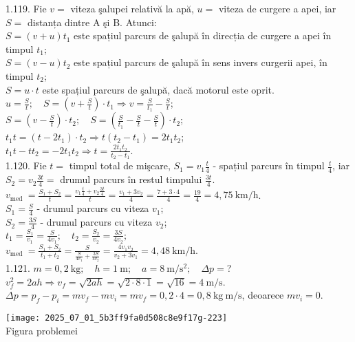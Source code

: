 1.119. Fie $v=$ viteza şalupei relativă la apă, $u=$ viteza de curgere a apei, iar $S=$ distanța dintre A şi B. Atunci:\\ $S=(v+u) t_{1}$ este spațiul parcurs de şalupă în direcția de curgere a apei în timpul $t_{1}$;\\ $S=(v-u) t_{2}$ este spațiul parcurs de şalupă în sens invers curgerii apei, în timpul $t_{2}$;\\ $S=u \cdot t$ este spațiul parcurs de şalupă, dacă motorul este oprit.\\ $u=\frac{S}{t}; \quad S=\left(v+\frac{S}{t}\right) \cdot t_{1} \Rightarrow v=\frac{S}{t_{1}}-\frac{S}{t}$;\\ $S=\left(v-\frac{S}{t}\right) \cdot t_{2}; \quad S=\left(\frac{S}{t_{1}}-\frac{S}{t}-\frac{S}{t}\right) \cdot t_{2}$;\\ $t_{1} t=\left(t-2 t_{1}\right) \cdot t_{2} \Rightarrow t\left(t_{2}-t_{1}\right)=2 t_{1} t_{2}$;\\ $t_{1} t-t t_{2}=-2 t_{1} t_{2} \Rightarrow t=\frac{2 t_{1} t_{2}}{t_{2}-t_{1}}$.\\

1.120. Fie $t=$ timpul total de mişcare, $S_{1}=v_{1} \frac{t}{4}$ - spațiul parcurs în timpul $\frac{t}{4}$, iar $S_{2}=v_{2} \frac{3 t}{4}=$ drumul parcurs în restul timpului $\frac{3 t}{4}$.\\ $v_{\text {med }}=\frac{S_{1}+S_{2}}{t}=\frac{v_{1} \frac{t}{4}+v_{2} \frac{3 t}{4}}{t}=\frac{v_{1}+3 v_{2}}{4}=\frac{7+3 \cdot 4}{4}=\frac{19}{4}=4,75 \mathrm{~km} / \mathrm{h}$.\\ $S_{1}=\frac{S}{4}$ - drumul parcurs cu viteza $v_{1}$;\\ $S_{2}=\frac{3 S}{4}$ - drumul parcurs cu viteza $v_{2}$;\\ $t_{1}=\frac{S_{1}}{v_{1}}=\frac{S}{4 v_{1}}; \quad t_{2}=\frac{S_{2}}{v_{2}}=\frac{3 S}{4 v_{2}};$\\ $v_{\text {med }}=\frac{S_{1}+S_{2}}{t_{1}+t_{2}}=\frac{S}{\frac{S}{4 v_{1}}+\frac{3 S}{4 v_{2}}}=\frac{4 v_{1} v_{2}}{v_{2}+3 v_{1}}=4,48 \mathrm{~km} / \mathrm{h}$.\\

1.121. $m=0,2 \mathrm{~kg}; \quad h=1 \mathrm{~m}; \quad a=8 \mathrm{~m} / \mathrm{s}^{2}; \quad \Delta p=$?\\ $v_{f}^{2}=2 a h \Rightarrow v_{f}=\sqrt{2 a h}=\sqrt{2 \cdot 8 \cdot 1}=\sqrt{16}=4 \mathrm{~m} / \mathrm{s}$.\\ $\Delta p=p_{f}-p_{i}=m v_{f}-m v_{i}=m v_{f}=0,2 \cdot 4=0,8 \mathrm{~kg} \mathrm{~m} / \mathrm{s}$, deoarece $m v_{i}=0$.\\ \begin{center} \texttt{[image: 2025\_07\_01\_5b3ff9fa0d508c8e9f17g-223]}\\ Figura problemei \end{center}\\

